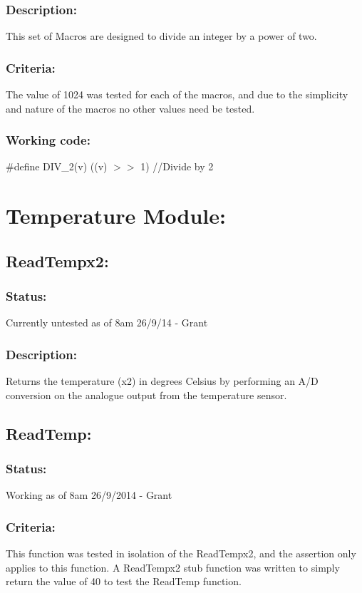 \documentclass[]{article}
\begin{document}
\subsubsection{Description:}
This set of Macros are designed to divide an integer by a power of two.

\subsubsection{Criteria:}
The value of 1024 was tested for each of the macros, and due to the simplicity and nature of the macros no other values need be tested.

\subsubsection{Working code:}
\#define DIV\_2(v) ((v) $>>$ 1)       //Divide by 2

\newpage
\section{Temperature Module:}

\subsection{ReadTempx2:}

\subsubsection{Status:}
Currently untested as of 8am 26/9/14 - Grant

\subsubsection{Description:}
Returns the temperature (x2) in degrees Celsius by performing an A/D conversion on the analogue output from the temperature sensor.

\subsection{ReadTemp:}
\subsubsection{Status:}
Working as of 8am 26/9/2014 - Grant

\subsubsection{Criteria:}
This function was tested in isolation of the ReadTempx2, and the assertion only applies to this function. A ReadTempx2 stub function was written to simply return the value of 40 to test the ReadTemp function.
\end{document}
